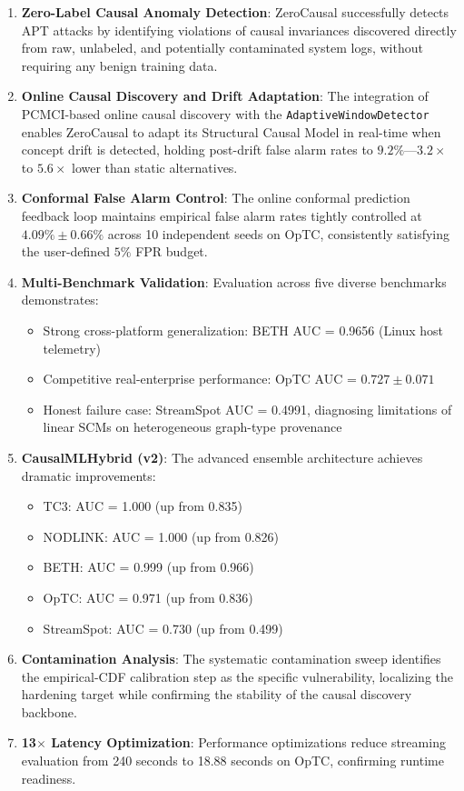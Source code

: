 \begin{enumerate}
\item \textbf{Zero-Label Causal Anomaly Detection}: ZeroCausal successfully detects APT attacks by identifying violations of causal invariances discovered directly from raw, unlabeled, and potentially contaminated system logs, without requiring any benign training data.

\item \textbf{Online Causal Discovery and Drift Adaptation}: The integration of PCMCI-based online causal discovery with the \texttt{AdaptiveWindowDetector} enables ZeroCausal to adapt its Structural Causal Model in real-time when concept drift is detected, holding post-drift false alarm rates to $9.2\%$---$3.2\times$ to $5.6\times$ lower than static alternatives.

\item \textbf{Conformal False Alarm Control}: The online conformal prediction feedback loop maintains empirical false alarm rates tightly controlled at $4.09\% \pm 0.66\%$ across 10 independent seeds on OpTC, consistently satisfying the user-defined $5\%$ FPR budget.

\item \textbf{Multi-Benchmark Validation}: Evaluation across five diverse benchmarks demonstrates:
\begin{itemize}
\item Strong cross-platform generalization: BETH AUC = 0.9656 (Linux host telemetry)
\item Competitive real-enterprise performance: OpTC AUC = $0.727 \pm 0.071$
\item Honest failure case: StreamSpot AUC = 0.4991, diagnosing limitations of linear SCMs on heterogeneous graph-type provenance
\end{itemize}

\item \textbf{CausalMLHybrid (v2)}: The advanced ensemble architecture achieves dramatic improvements:
\begin{itemize}
\item TC3: AUC = 1.000 (up from 0.835)
\item NODLINK: AUC = 1.000 (up from 0.826)
\item BETH: AUC = 0.999 (up from 0.966)
\item OpTC: AUC = 0.971 (up from 0.836)
\item StreamSpot: AUC = 0.730 (up from 0.499)
\end{itemize}

\item \textbf{Contamination Analysis}: The systematic contamination sweep identifies the empirical-CDF calibration step as the specific vulnerability, localizing the hardening target while confirming the stability of the causal discovery backbone.

\item \textbf{13$\times$ Latency Optimization}: Performance optimizations reduce streaming evaluation from 240 seconds to 18.88 seconds on OpTC, confirming runtime readiness.
\end{enumerate}

